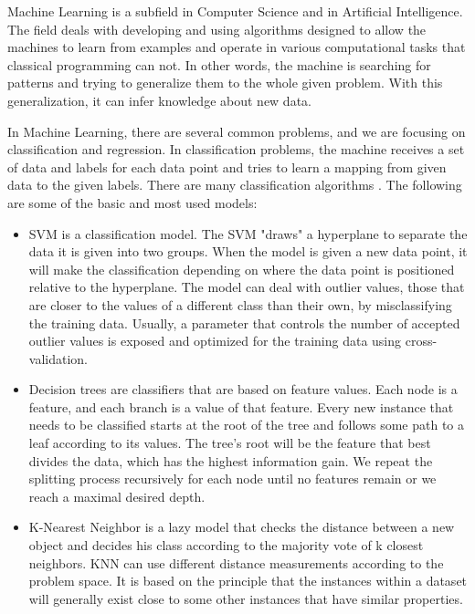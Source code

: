 \documentclass[../main.tex]{subfiles}
\begin{document}
Machine Learning is a subfield in Computer Science and in Artificial Intelligence. 
The field deals with developing and using algorithms designed to allow the machines to 
learn from examples and operate in various computational tasks that classical programming can not. 
In other words, the machine is searching for patterns and trying to generalize them to 
the whole given problem. With this generalization, it can infer knowledge about new data.
\par
 
In Machine Learning, there are several common problems, and we are focusing on classification 
and regression.
In classification problems, the machine receives a set of data and labels for each data point and 
tries to learn a mapping from given data to the given labels. 
There are many classification algorithms \cite{machine_learning_classification_algorithms}. The following are some of the basic and most 
used models:

 
\begin{itemize}
    \item SVM is a classification model. The SVM "draws" a hyperplane to separate the data it is given into two groups.
        When the model is given a new data point, it will make the classification depending on where the data point is positioned
        relative to the hyperplane. The model can deal with outlier values, those that are closer to the values of a different class than their own,
        by misclassifying the training data. Usually, a parameter that controls the number of accepted outlier values is exposed and optimized for
        the training data using cross-validation.
    \item Decision trees are classifiers that are based on feature values. Each node is a feature, and each branch is a value of that feature.
        Every new instance that needs to be classified starts at the root of the tree and follows some path to a leaf according to its values.
        The tree's root will be the feature that best divides the data, which has the highest information gain.
        We repeat the splitting process recursively for each node until no features remain or we reach a maximal desired depth.
    \item K-Nearest Neighbor is a lazy model that checks the distance between a new object and decides his class according
        to the majority vote of k closest neighbors. KNN can use different distance measurements according to the problem space.
        It is based on the principle that the instances within a dataset will generally exist close to some other instances that have
        similar properties.
\end{itemize}
\end{document}
